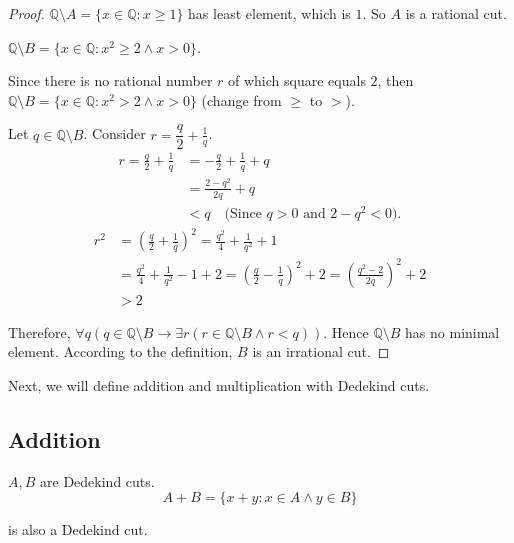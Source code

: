 \begin{proof}
    \par $\mathbb{Q}\setminus A = \{ x\in\mathbb{Q}: x\ge 1 \}$ has least element, which is $1$. So $ A$ is a rational cut.
    \bigskip
    \par $\mathbb{Q}\setminus B = \{ x\in\mathbb{Q}: {x}^{2}\ge 2 \wedge x > 0 \}$.
    \par Since there is no rational number $r$ of which square equals $2$, then $\mathbb{Q}\setminus B = \{ x\in\mathbb{Q}: {x}^{2} > 2 \wedge x > 0 \}$ (change from $\ge$ to $>$).
    \par Let $q\in\mathbb{Q}\setminus B$. Consider $r = \dfrac{q}{2} + \frac{1}{q}$.
    \begin{align*}
        r = \frac{q}{2} + \frac{1}{q} & = -\frac{q}{2} + \frac{1}{q} + q                       \\
                                      & = \frac{2 - {q}^{2}}{2q} + q                           \\
                                      & < q \quad\text{(Since $q > 0$ and $2 - {q}^{2} < 0$)}.
    \end{align*}
    \begin{align*}
        {r}^{2} & = {\left(\frac{q}{2} + \frac{1}{q}\right)}^{2} = \frac{q^{2}}{4} + \frac{1}{q^{2}} + 1                                                         \\
                & = \frac{q^{2}}{4} + \frac{1}{q^{2}} - 1 + 2 = {\left(\frac{q}{2} - \frac{1}{q}\right)}^{2} + 2 = {\left( \frac{q^{2} - 2}{2q} \right)}^{2} + 2 \\
                & > 2
    \end{align*}
    \par Therefore, $\forall q(q\in\mathbb{Q}\setminus B \rightarrow \exists r( r\in\mathbb{Q}\setminus B \wedge r < q ))$. Hence $\mathbb{Q}\setminus B$ has no minimal element. According to the definition, $ B$ is an irrational cut.
\end{proof}

\par Next, we will define addition and multiplication with Dedekind cuts.

\subsection{Addition}

\begin{theorem}[Addition]
    \par $A, B$ are Dedekind cuts.
    \[
        A + B = \{ x + y : x\in A \wedge y\in B \}
    \]
    \par is also a Dedekind cut.
\end{theorem}

